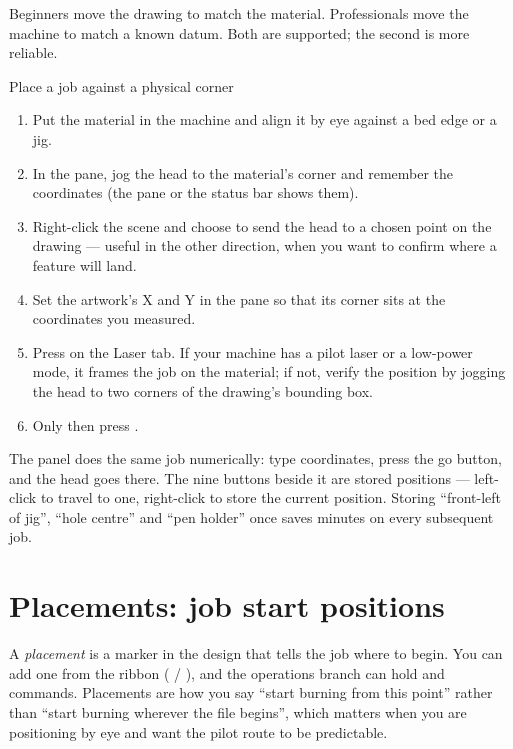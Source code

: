 Beginners move the drawing to match the material. Professionals move the machine
to match a known datum. Both are supported; the second is more reliable.

\begin{walkthrough}{Place a job against a physical corner}
\begin{enumerate}[label=\arabic*.,leftmargin=1.4em]
  \item Put the material in the machine and align it by eye against a bed edge or
        a jig.
  \item In the  pane, jog the head to the material's corner and
        remember the coordinates (the  pane or the status bar
        shows them).
  \item Right-click the scene and choose  to send the
        head to a chosen point on the drawing --- useful in the other direction,
        when you want to confirm where a feature will land.
  \item Set the artwork's X and Y in the  pane so that its corner
        sits at the coordinates you measured.
  \item Press  on the Laser tab. If your machine has a pilot laser
        or a low-power mode, it frames the job on the material; if not, verify
        the position by jogging the head to two corners of the drawing's bounding
        box.
  \item Only then press .
\end{enumerate}
\end{walkthrough}

\noindent The  panel does the same job numerically: type
coordinates, press the go button, and the head goes there. The nine buttons beside
it are stored positions --- left-click to travel to one, right-click to store the
current position. Storing ``front-left of jig'', ``hole centre'' and ``pen
holder'' once saves minutes on every subsequent job.

\section{Placements: job start positions}

A \emph{placement} is a marker in the design that tells the job where to begin.
You can add one from the ribbon ( / ), and the
operations branch can hold  and  commands. Placements are how you say ``start burning from
this point'' rather than ``start burning wherever the file begins'', which
matters when you are positioning by eye and want the pilot route to be
predictable.

